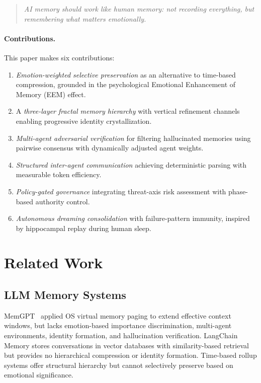 \documentclass[11pt,a4paper]{article}
\begin{document}
\begin{quote}
\emph{AI memory should work like human memory: not recording everything, but remembering
what matters emotionally.}
\end{quote}

\paragraph{Contributions.} This paper makes six contributions:
\begin{enumerate}[leftmargin=*, itemsep=2pt]
  \item \emph{Emotion-weighted selective preservation} as an alternative to time-based
        compression, grounded in the psychological Emotional Enhancement of Memory (EEM)
        effect.
  \item A \emph{three-layer fractal memory hierarchy} with vertical refinement channels
        enabling progressive identity crystallization.
  \item \emph{Multi-agent adversarial verification} for filtering hallucinated memories
        using pairwise consensus with dynamically adjusted agent weights.
  \item \emph{Structured inter-agent communication} achieving deterministic parsing with
        measurable token efficiency.
  \item \emph{Policy-gated governance} integrating threat-axis risk assessment with
        phase-based authority control.
  \item \emph{Autonomous dreaming consolidation} with failure-pattern immunity, inspired
        by hippocampal replay during human sleep.
\end{enumerate}

\section{Related Work}

\subsection{LLM Memory Systems}
MemGPT~\citep{packer2023memgpt} applied OS virtual memory paging to extend effective context
windows, but lacks emotion-based importance discrimination, multi-agent environments, identity
formation, and hallucination verification. LangChain Memory stores conversations in vector
databases with similarity-based retrieval but provides no hierarchical compression or identity
formation. Time-based rollup systems offer structural hierarchy but cannot selectively
preserve based on emotional significance.
\end{document}
